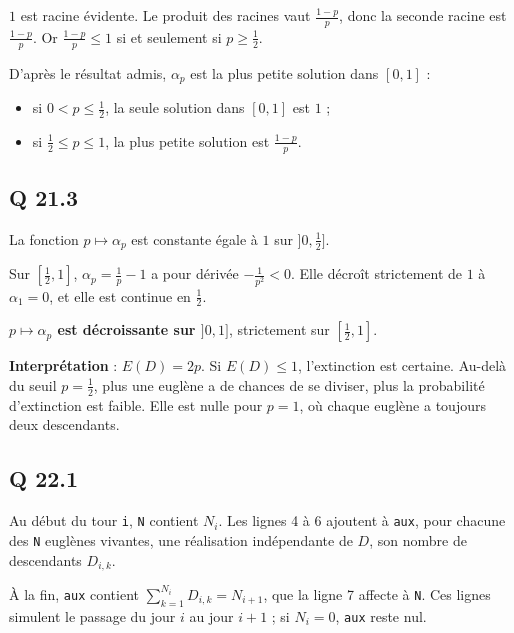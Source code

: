 \documentclass[11pt,a4paper]{article}
\providecommand{\tightlist}{\setlength{\itemsep}{0pt}\setlength{\parskip}{0pt}}
\newcommand{\equationajustee}[1]{%
  \sbox{\boiteequation}{$\displaystyle #1$}%
  \ifdim\wd\boiteequation>\linewidth
    \[\resizebox{\linewidth}{!}{\usebox{\boiteequation}}\]%
  \else
    \[#1\]%
  \fi}
\begin{document}
\equationajustee{pt^2-t+1-p=0 .}

\(1\) est racine évidente. Le produit des racines vaut \(\frac{1-p}p\), donc la seconde racine est \(\frac{1-p}p\). Or \(\frac{1-p}p\le1\) si et seulement si \(p\ge\frac12\).

D'après le résultat admis, \(\alpha_p\) est la plus petite solution dans \([0,1]\) :

\begin{itemize}
\tightlist
\item
  si \(0<p\le\frac12\), la seule solution dans \([0,1]\) est \(1\) ;
\item
  si \(\frac12\le p\le1\), la plus petite solution est \(\frac{1-p}p\).
\end{itemize}

\equationajustee{\boxed{\alpha_p=\min\Big(1,\ \frac{1-p}p\Big)}}

\hypertarget{q-21.3}{%
\subsection{Q 21.3}\label{q-21.3}}

La fonction \(p\mapsto\alpha_p\) est constante égale à \(1\) sur \(]0,\frac12]\).

Sur \([\frac12,1]\), \(\alpha_p=\frac1p-1\) a pour dérivée \(-\frac1{p^2}<0\). Elle décroît strictement de \(1\) à \(\alpha_1=0\), et elle est continue en \(\frac12\).

\textbf{\(p\mapsto\alpha_p\) est décroissante sur \(]0,1]\)}, strictement sur \([\frac12,1]\).

\textbf{Interprétation} : \(E(D)=2p\). Si \(E(D)\le1\), l'extinction est certaine. Au-delà du seuil \(p=\frac12\), plus une euglène a de chances de se diviser, plus la probabilité d'extinction est faible. Elle est nulle pour \(p=1\), où chaque euglène a toujours deux descendants.

\hypertarget{q-22.1}{%
\subsection{Q 22.1}\label{q-22.1}}

Au début du tour \texttt{i}, \texttt{N} contient \(N_i\). Les lignes 4 à 6 ajoutent à \texttt{aux}, pour chacune des \texttt{N} euglènes vivantes, une réalisation indépendante de \(D\), son nombre de descendants \(D_{i,k}\).

À la fin, \texttt{aux} contient \(\sum_{k=1}^{N_i}D_{i,k}=N_{i+1}\), que la ligne 7 affecte à \texttt{N}. Ces lignes simulent le passage du jour \(i\) au jour \(i+1\) ; si \(N_i=0\), \texttt{aux} reste nul.
\end{document}
